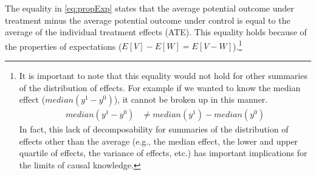 \documentclass{article}
\begin{document}
The equality in \eqref{eq:propExp} states that the average potential outcome under treatment minus the average potential outcome under control is equal to the average of the individual treatment effects (ATE). This equality holds because of the properties of expectations ($E[V] - E[W] = E[V-W]$).\footnote{It is important to note that this equality would not hold for other summaries of the distribution of effects. For example if we wanted to know the median effect ($median(y^1- y^0)$), it cannot be broken up in this manner. 
\begin{align*}
median(y^1- y^0) &\ne median(y^1) - median(y^0)
\end{align*}
In fact, this lack of decomposability for summaries of the distribution of effects other than the average (e.g., the median effect, the lower and upper quartile of effects, the variance of effects, etc.) has important implications for the limits of causal knowledge.}
\end{document}
